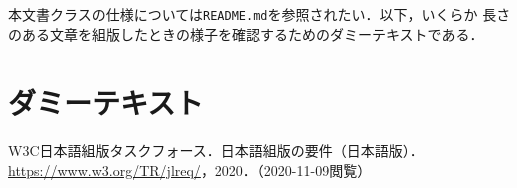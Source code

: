 \documentclass[
  platex, dvipdfmx,  %
]{nlproceedings}
\newcommand{\code}[1]{\texttt{#1}}
\begin{document}
本文書クラスの仕様については\code{README.md}を参照されたい．以下，いくらか
長さのある文章を組版したときの様子を確認するためのダミーテキストである．

\section{ダミーテキスト}



\begin{thebibliography}{9}
  W3C日本語組版タスクフォース．日本語組版の要件（日本語版）．
  \url{https://www.w3.org/TR/jlreq/}，2020．（2020-11-09閲覧）
\end{thebibliography}
\end{document}
